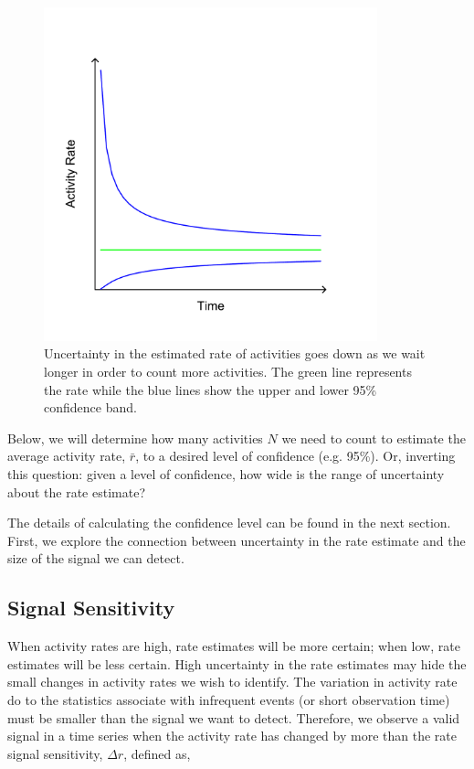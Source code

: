 \documentclass{article}
\begin{document}
%
\begin{figure}[h]
	\begin{center}
		\includegraphics[width=3.8in]{./imgs/fig2.pdf}
	\end{center}
	\caption{Uncertainty in the estimated rate of activities goes down as we wait longer in order to count more activities.  The green line
represents the rate while the blue lines show the upper and lower 95\% confidence band. }
    	\label{fig:confidence}
\end{figure}
%
%

Below, we will determine how many activities $N$ we need to count to estimate the average activity rate, $\bar{r}$, to a desired level
of confidence (e.g. 95\%). Or, inverting this question: given a level of confidence, how wide is the range of uncertainty
about the rate estimate?

The details of calculating the confidence level can be found in the next section.  First, we explore the connection between
uncertainty in the rate estimate and the size of the signal we can detect.

%
%

\subsection{Signal Sensitivity}

When activity rates are high, rate estimates will be more certain; when low, rate estimates will be less certain. High uncertainty
in the rate estimates may hide the small changes in activity rates we wish to identify.  The variation in activity rate do to the statistics
associate with infrequent events (or short observation time) must be smaller than the signal we want to detect. Therefore, we observe
a valid signal in a time series when the activity rate has changed by more than the rate signal sensitivity, $\Delta r$, defined as,
\end{document}
